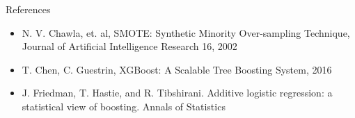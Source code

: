 \documentclass{beamer}
\begin{document}
\begin{frame}{References}

\begin{itemize}
\item N. V. Chawla, et. al, SMOTE: Synthetic Minority Over-sampling Technique, Journal of Artificial Intelligence Research 16, 2002
\item T. Chen, C. Guestrin, XGBoost: A Scalable Tree Boosting System, 2016
\item J. Friedman, T. Hastie, and R. Tibshirani. Additive logistic
regression: a statistical view of boosting. Annals of
Statistics
\end{itemize}
\end{frame}
\end{document}

